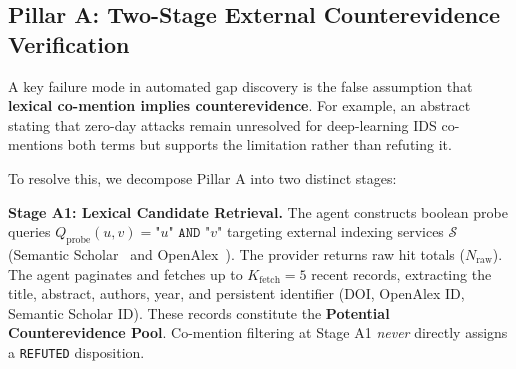 \documentclass[runningheads]{llncs}
\begin{document}
\subsection{Pillar A: Two-Stage External Counterevidence Verification}
\label{sec:pillar_a}

A key failure mode in automated gap discovery is the false assumption that \textbf{lexical co-mention implies counterevidence}. For example, an abstract stating that zero-day attacks remain unresolved for deep-learning IDS co-mentions both terms but supports the limitation rather than refuting it.

To resolve this, we decompose Pillar A into two distinct stages:

\noindent\textbf{Stage A1: Lexical Candidate Retrieval.} The agent constructs boolean probe queries $Q_{\text{probe}}(u, v) = \texttt{"}u\texttt{" AND "}v\texttt{"}$ targeting external indexing services $\mathcal{S}$ (Semantic Scholar~\cite{semanticscholar2023} and OpenAlex~\cite{openalex2022}). The provider returns raw hit totals ($N_{\text{raw}}$). The agent paginates and fetches up to $K_{\text{fetch}} = 5$ recent records, extracting the title, abstract, authors, year, and persistent identifier (DOI, OpenAlex ID, Semantic Scholar ID). These records constitute the \textbf{Potential Counterevidence Pool}. Co-mention filtering at Stage A1 \emph{never} directly assigns a \texttt{REFUTED} disposition.
\end{document}
